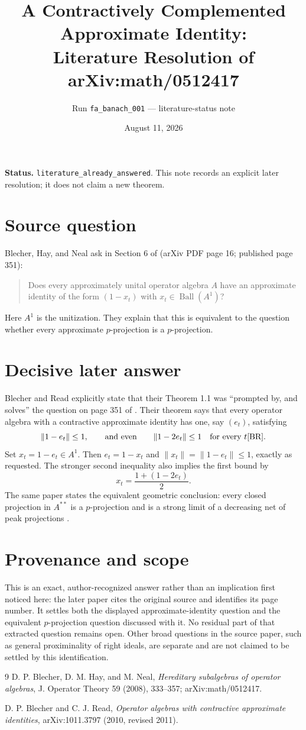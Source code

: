 \documentclass[11pt]{article}
\title{A Contractively Complemented Approximate Identity:\\
Literature Resolution of arXiv:math/0512417}
\author{Run \texttt{fa\_banach\_001} --- literature-status note}
\date{August 11, 2026}
\begin{document}
\maketitle

\noindent\textbf{Status.} \texttt{literature\_already\_answered}. This note
records an explicit later resolution; it does not claim a new theorem.

\section*{Source question}
Blecher, Hay, and Neal ask in Section 6 of \cite{BHN} (arXiv PDF page 16;
published page 351):
\begin{quote}
Does every approximately unital operator algebra $A$ have an approximate
identity of the form $(1-x_t)$ with $x_t\in\operatorname{Ball}(A^1)$?
\end{quote}
Here $A^1$ is the unitization. They explain that this is equivalent to the
question whether every approximate $p$-projection is a $p$-projection.

\section*{Decisive later answer}
Blecher and Read explicitly state that their Theorem 1.1 was ``prompted by,
and solves'' the question on page 351 of \cite{BHN}. Their theorem says that
every operator algebra with a contractive approximate identity has one,
say $(e_t)$, satisfying
\[
 \|1-e_t\|\le 1,
 \qquad\text{and even}\qquad
 \|1-2e_t\|\le 1
 \quad\text{for every }t \cite[Theorem 1.1]{BR}.
\]
Set $x_t=1-e_t\in A^1$. Then $e_t=1-x_t$ and
$\|x_t\|=\|1-e_t\|\le1$, exactly as requested. The stronger second
inequality also implies the first bound by
\[
 x_t=\frac{1+(1-2e_t)}2.
\]
The same paper states the equivalent geometric conclusion: every closed
projection in $A^{**}$ is a $p$-projection and is a strong limit of a
decreasing net of peak projections \cite[Theorem 1.2]{BR}.

\section*{Provenance and scope}
This is an exact, author-recognized answer rather than an implication first
noticed here: the later paper cites the original source and identifies its
page number. It settles both the displayed approximate-identity question and
the equivalent $p$-projection question discussed with it. No residual part of
that extracted question remains open. Other broad questions in the source
paper, such as general proximinality of right ideals, are separate and are not
claimed to be settled by this identification.

\begin{thebibliography}{9}
D. P. Blecher, D. M. Hay, and M. Neal,
\emph{Hereditary subalgebras of operator algebras},
J. Operator Theory 59 (2008), 333--357; arXiv:math/0512417.

D. P. Blecher and C. J. Read,
\emph{Operator algebras with contractive approximate identities},
arXiv:1011.3797 (2010, revised 2011).
\end{thebibliography}
\end{document}
